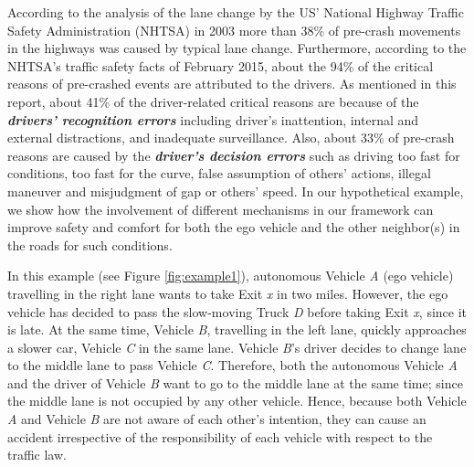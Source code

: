 \documentclass[journal, 11pt]{IEEEtran}
\begin{document}
According to the analysis of the lane change by the US' National Highway Traffic
Safety Administration (NHTSA) in 2003 more than 38\% of pre-crash movements in
the highways was caused by typical lane change. Furthermore, according to the
NHTSA's traffic safety facts of February 2015, about the 94\% of the critical
reasons of pre-crashed events are attributed to the drivers. As mentioned in
this report, about 41\% of the driver-related critical reasons are because of
the \textit{\textbf{drivers' recognition errors}} including driver’s
inattention, internal and external distractions, and inadequate surveillance.
Also, about 33\% of pre-crash reasons are caused by the \textit{\textbf{driver's
decision errors}} such as driving too fast for conditions, too fast for the
curve, false assumption of others’ actions, illegal maneuver and misjudgment of
gap or others’ speed. In our hypothetical example, we show how the involvement
of different mechanisms in our framework can improve safety and comfort for both
the ego vehicle and the other neighbor(s) in the roads for such conditions.

In this example (see Figure \ref{fig:example1}), autonomous Vehicle
\textit{A} (ego vehicle) travelling in the right lane wants to take Exit
\textit{x} in two miles. However, the ego vehicle has decided to pass the
slow-moving Truck \textit{D} before taking Exit \textit{x}, since it is late. At
the same time, Vehicle \textit{B}, travelling in the left lane, quickly
approaches a slower car, Vehicle \textit{C} in the same lane. Vehicle
\textit{B}'s driver decides to change lane to the middle lane to pass Vehicle
\textit{C}. Therefore, both the autonomous Vehicle \textit{A} and the driver of
Vehicle \textit{B} want to go to the middle lane at the same time; since the
middle lane is not occupied by any other vehicle. Hence, because both Vehicle
\textit{A} and Vehicle \textit{B} are not aware of each other's intention, they
can cause an accident irrespective of the responsibility of each vehicle with
respect to the traffic law.
\end{document}
